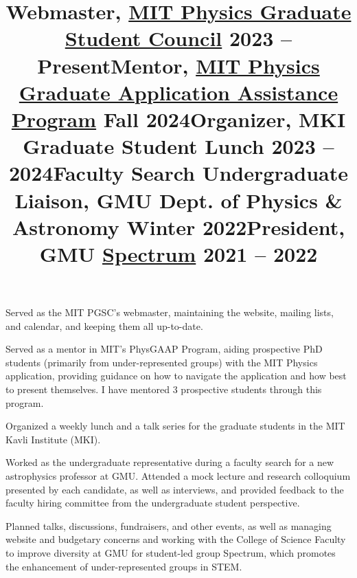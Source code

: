\documentclass[marg, centered]{res}
\begin{document}
\begin{resume}
\vspace{-0.2cm}
\title{\textbf{Webmaster}, \href{https://physics-gsc.scripts.mit.edu/home/}{\color{dkbu} MIT Physics Graduate Student Council} \hfill \textbf{2023 -- Present}}
\begin{position}
{\small Served as the MIT PGSC's webmaster, maintaining the website, mailing lists, and calendar, and keeping them all up-to-date.}
\end{position}

\vspace{-0.2cm}
\title{\textbf{Mentor}, \href{https://sites.mit.edu/physgaap/}{\color{dkbu} MIT Physics Graduate Application Assistance Program} \hfill \textbf{Fall 2024}}
\begin{position}
{\small Served as a mentor in MIT's PhysGAAP Program, aiding prospective PhD students (primarily from under-represented groups) with the MIT Physics application, providing guidance on how to navigate the application and how best to present themselves.  I have mentored 3 prospective students through this program.}
\end{position}

\vspace{-0.2cm}
\title{\textbf{Organizer}, MKI Graduate Student Lunch \hfill \textbf{2023 -- 2024}}
\begin{position}
{\small Organized a weekly lunch and a talk series for the graduate students in the MIT Kavli Institute (MKI).}
\end{position}

\vspace{-0.2cm}
\title{\textbf{Faculty Search Undergraduate Liaison}, GMU Dept. of Physics \& Astronomy \hfill \textbf{Winter 2022}}
\begin{position}
{\small Worked as the undergraduate representative during a faculty search for a new astrophysics professor at GMU. Attended a mock lecture and research colloquium presented by each candidate, as well as interviews, and provided feedback to the faculty hiring committee from the undergraduate student perspective.}
\end{position}

\vspace{-0.2cm}
\title{\textbf{President}, GMU \href{https://gmuspectrum.squarespace.com/}{\color{dkbu} Spectrum} \hfill \textbf{2021 -- 2022}}
\begin{position}
{\small Planned talks, discussions, fundraisers, and other events, as well as managing website and budgetary concerns and working with the College of Science Faculty to improve diversity at GMU for student-led group Spectrum, which promotes the enhancement of under-represented groups in STEM.}
\end{position}


\end{resume}
\end{document}
